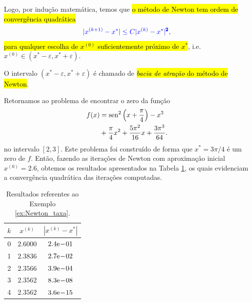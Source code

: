 Logo, por indução matemática, temos que \hl{o método de Newton tem ordem de convergência quadrática}
\begin{equation}\label{eq:Newton_taxa_quadratica}
  \color{blue}|x^{(k+1)}-x^*| \leq C|x^{(k)}-x^{*}|^{\pmb{2}},
\end{equation}
\hl{para qualquer escolha de $x^{(0)}$ suficientemente próximo de $x^*$}, i.e. $x^{(0)}\in (x^*-\varepsilon, x^*+\varepsilon)$.

\begin{obs}
  O intervalo $(x^*-\varepsilon, x^*+\varepsilon)$ é chamado de \hl{\emph{bacia de atração} do método de Newton}.
\end{obs}

\begin{ex}\label{ex:Newton_taxa}
  Retornamos ao problema de encontrar o zero da função
  \begin{equation}
    \begin{aligned}
      f(x) &= \operatorname{sen}^2\left(x+\frac{\pi}{4}\right) - x^3 \\
      &+ \frac{\pi}{4}x^2 + \frac{5\pi^2}{16}x + \frac{3\pi^3}{64}.
  \end{aligned}
  \end{equation}
  no intervalo $[2, 3]$. Este problema foi construído de forma que $x^* = 3\pi/4$ é um zero de $f$. Então, fazendo as iterações de Newton com aproximação inicial $x^{(0)}=2.6$, obtemos os resultados apresentados na Tabela \ref{tab:ex_Newton_taxa}, os quais evidenciam a convergência quadrática das iterações computadas.

\begin{table}[h!]
  \centering
  \caption{Resultados referentes ao Exemplo \ref{ex:Newton_taxa}.}
  \label{tab:ex_Newton_taxa}
  \begin{tabular}{r|cc}
    $k$ & $x^{(k)}$ & $|x^{(k)}-x^*|$ \\\hline
    0 & $2.6000$ & $2.4\mathrm{e}\!-\!01$ \\
    1 & $2.3836$ & $2.7\mathrm{e}\!-\!02$ \\
    2 & $2.3566$ & $3.9\mathrm{e}\!-\!04$ \\
    3 & $2.3562$ & $8.3\mathrm{e}\!-\!08$ \\
    4 & $2.3562$ & $3.6\mathrm{e}\!-\!15$ \\\hline
  \end{tabular}
\end{table}

\end{ex}


